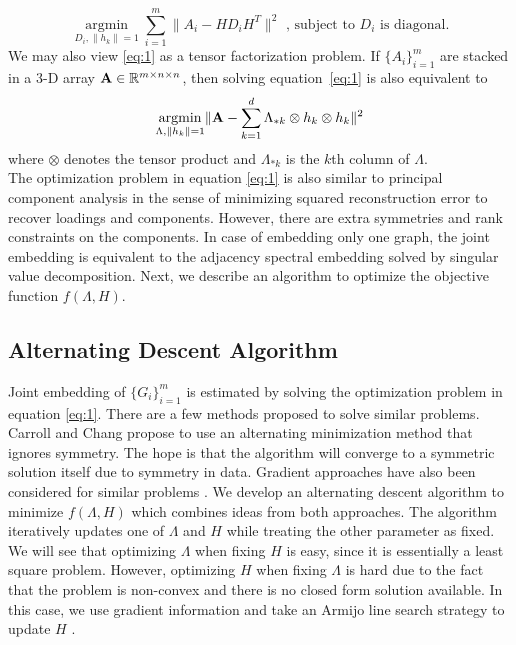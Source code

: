 \documentclass[10pt,journal,compsoc]{IEEEtran}
\begin{document}
\[  \underset{D_i,\|h_k\|=1}{\operatorname{argmin}} \sum\limits_{i=1}^{m} \| A_i- H D_i H^T \|  ^2  \text{ , subject to $D_i$ is diagonal.}\]
We may also view \eqref{eq:1} as a tensor factorization problem. If $\{A_i\}_{i=1}^m$ are stacked in a 3-D array ${\bf A} \in \mathbb{R}^{m\times n \times n}$, then solving equation~\eqref{eq:1} is also equivalent to
\[  \underset{\Lambda,\|h_k\|=1}{\operatorname{argmin}}  \| {\bf A} - \sum\limits_{k=1}^{d} \Lambda_{*k} \otimes h_k \otimes h_k\|  ^2  \]
where $\otimes$ denotes the tensor product and $\Lambda_{*k}$ is the $k$th column of $\Lambda$. \\

\noindent The optimization problem in equation \eqref{eq:1} is also similar to principal component analysis in the sense of minimizing squared reconstruction error to recover loadings and components. However, there are extra symmetries and rank constraints on the components. In case of embedding only one graph, the joint embedding is equivalent to the adjacency spectral embedding solved by singular value decomposition\cite{sussman2012consistent}. Next, we describe an algorithm to optimize the objective function $f(\Lambda,H)$.  

\subsection{Alternating Descent Algorithm}
\noindent Joint embedding of $\{G_i \} _{i=1}^{m}$ is estimated by solving the optimization problem in equation \eqref{eq:1}. There are a few methods proposed to solve similar problems. Carroll and Chang \cite{carroll1970analysis} propose to use an alternating minimization method that ignores symmetry. The hope is that the algorithm will converge to a symmetric solution itself due to symmetry in data. Gradient approaches have also been considered for similar problems \cite{tang2009clustering} \cite{kolda2015numerical}. We develop an alternating descent algorithm to minimize $f(\Lambda,H)$ which combines ideas from both approaches. The algorithm iteratively updates one of $\Lambda$ and $H$ while treating the other parameter as fixed. We will see that optimizing $\Lambda$ when fixing $H$ is easy, since it is essentially a least square problem. However, optimizing $H$ when fixing $\Lambda$ is hard due to the fact that the problem is non-convex and there is no closed form solution available. In this case, we use gradient information and take an Armijo line search strategy to update $H$ \cite{nocedal2006numerical}. \\
\end{document}

